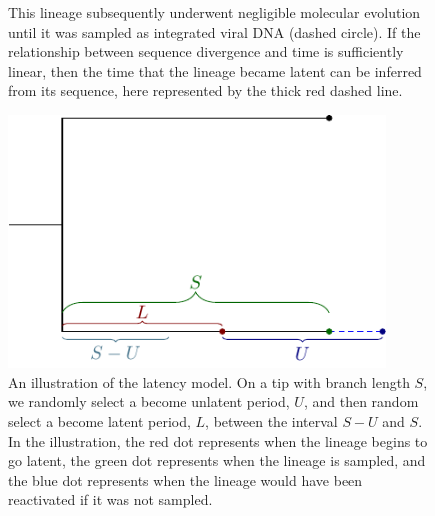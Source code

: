 \documentclass[12pt]{article}
\begin{document}
\begin{figure}[ht]
{	This lineage subsequently underwent negligible molecular evolution until it was sampled as integrated viral DNA (dashed circle).
	If the relationship between sequence divergence and time is sufficiently linear, then the time that the lineage became latent can be inferred from its sequence, here represented by the thick red dashed line.
	}
	\label{fig:latenttree}
\end{figure}

\begin{figure}[ht]
	\centering{}
	\includegraphics[width=10cm]{figures/latency-model}
	\caption[Latency Model]{An illustration of the latency model. On a tip with branch length $S$, we randomly select a become unlatent period, $U$, and then random select a become latent period, $L$, between the interval $S-U$ and $S$. In the illustration, the red dot represents when the lineage begins to go latent, the green dot represents when the lineage is sampled, and the blue dot represents when the lineage would have been reactivated if it was not sampled. }
	\label{fig:latencymodel}
\end{figure}
\end{document}
